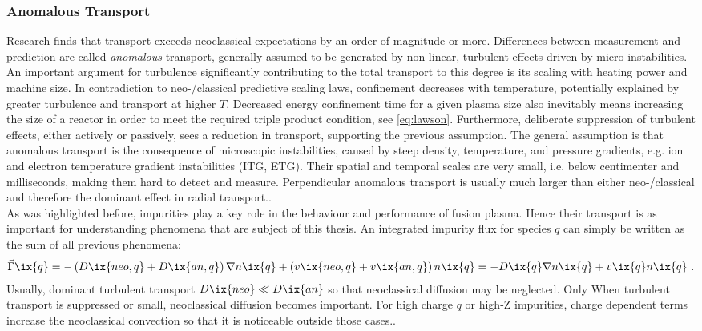             \subsubsection*{Anomalous Transport}%
%
                Research finds that transport exceeds neoclassical expectations by an order of magnitude or more. Differences between measurement and prediction are called \textit{anomalous} transport, generally assumed to be generated by non-linear, turbulent effects driven by micro-instabilities. An important argument for turbulence significantly contributing to the total transport to this degree is its scaling with heating power and machine size. In contradiction to neo-/classical predictive scaling laws, confinement decreases with temperature, potentially explained by greater turbulence and transport at higher $T$. Decreased energy confinement time for a given plasma size also inevitably means increasing the size of a reactor in order to meet the required triple product condition, see \cref{eq:lawson}. Furthermore, deliberate suppression of turbulent effects, either actively or passively, sees a reduction in transport, supporting the previous assumption. The general assumption is that anomalous transport is the consequence of microscopic instabilities, caused by steep density, temperature, and pressure gradients, e.g. ion and electron temperature gradient instabilities (ITG, ETG). Their spatial and temporal scales are very small, i.e. below centimenter and milliseconds, making them hard to detect and measure. Perpendicular anomalous transport is usually much larger than either neo-/classical and therefore the dominant effect in radial transport.\cite{Balescu2005,Milligen2004}.\\%
                As was highlighted before, impurities play a key role in the behaviour and performance of fusion plasma. Hence their transport is as important for understanding phenomena that are subject of this thesis. An integrated impurity flux for species $q$ can simply be written as the sum of all previous phenomena:%
%
                \begin{align}%
                    \vec{\Gamma}\ix{q}=-\left(D\ix{neo,q}+D\ix{an,q}\right)\nabla n\ix{q}+\left(v\ix{neo,q}+v\ix{an,q}\right)n\ix{q}=-D\ix{q}\nabla n\ix{q}+v\ix{q}n\ix{q}\,\,.\nonumber%
                \end{align}%
%
                Usually, dominant turbulent transport $D\ix{neo}\ll D\ix{an}$ so that neoclassical diffusion may be neglected. Only When turbulent transport is suppressed or small, neoclassical diffusion becomes important. For high charge $q$ or high-Z impurities, charge dependent terms increase the neoclassical convection so that it is noticeable outside those cases.\cite{Garcia2006,Langenberg2019}.%
%
